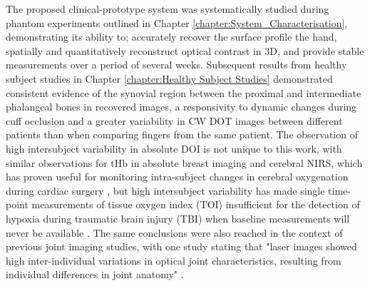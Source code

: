 \documentclass[twoside]{bhamthesis}
\theoremstyle{definition}
\begin{document}
The proposed clinical-prototype system was systematically studied during phantom experiments outlined in Chapter \ref{chapter:System_Characterisation}, demonstrating its ability to; accurately recover the surface profile the hand, spatially and quantitatively reconstruct optical contrast in 3D, and provide stable measurements over a period of several weeks. Subsequent results from healthy subject studies in Chapter \ref{chapter:Healthy Subject Studies} demonstrated consistent evidence of the synovial region between the proximal and intermediate phalangeal bones in recovered images, a responsivity to dynamic changes during cuff occlusion and a greater variability in CW DOT images between different patients than when comparing fingers from the same patient. The observation of high intersubject variability in absolute DOI is not unique to this work, with similar observations for tHb in absolute breast imaging \cite{shah2001noninvasive,cubeddu2000effects} and cerebral NIRS, which has proven useful for monitoring intra-subject changes in cerebral oxygenation during cardiac surgery \cite{fedorow2010cerebral}, but high intersubject variability has made single time-point measurements of tissue oxygen index (TOI) insufficient for the detection of hypoxia during traumatic brain injury (TBI) when baseline measurements will never be available \cite{lighter2016assessing,davies2017frequency}. The same conclusions were also reached in the context of previous joint imaging studies, with one study stating that "laser images showed high inter-individual variations in optical joint characteristics, resulting from individual differences in joint anatomy" \cite{schwaighofer2003classification}.
\end{document}
